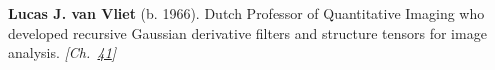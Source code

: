 \textbf{Lucas J. van Vliet} (b. 1966). Dutch Professor of Quantitative Imaging who developed recursive Gaussian derivative filters and structure tensors for image analysis. \emph{[Ch.~\hyperref[ch:hough]{41}]}

